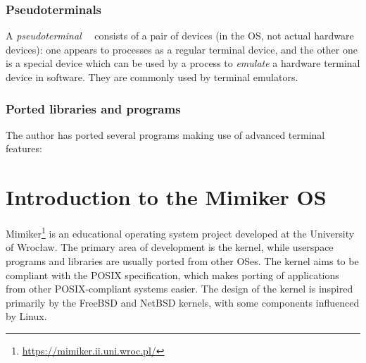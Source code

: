 \documentclass[shortabstract, manyadvisors, english, mgr]{iithesis}
\begin{document}
\subsubsection*{Pseudoterminals}

A
\textit{pseudoterminal}~\cite[Section~3.308]{posix-defs}~\cite[Chapter~19]{apue}
consists of a pair of devices (in the OS, not actual hardware devices): one
appears to processes as a regular terminal device, and the other one is a
special device which can be used by a process to \textit{emulate} a hardware
terminal device in software. They are commonly used by terminal emulators.

\subsubsection*{Ported libraries and programs}

The author has ported several programs making use of advanced terminal features:

\section{Introduction to the Mimiker OS}

Mimiker\footnote{\url{https://mimiker.ii.uni.wroc.pl/}} is an educational
operating system project developed at the University of Wrocław. The primary
area of development is the kernel, while userspace programs and libraries are
usually ported from other OSes. The kernel aims to be compliant with the POSIX
specification, which makes porting of applications from other POSIX-compliant
systems easier. The design of the kernel is inspired primarily by the
FreeBSD \cite{freebsd-book} and NetBSD kernels, with some components influenced
by Linux.
\end{document}
